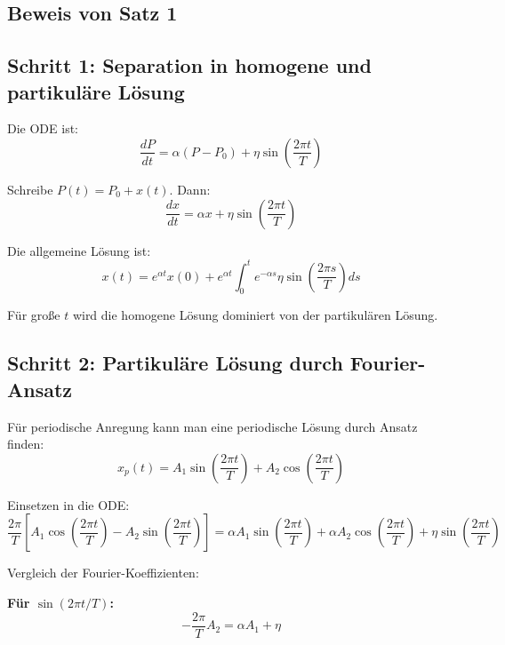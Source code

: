 \documentclass[a4paper, 12pt, twoside, openright]{report}
\theoremstyle{definition}
\theoremstyle{definition}
\begin{document}
\subsection{Beweis von Satz 1}

\subsection{Schritt 1: Separation in homogene und partikuläre Lösung}

Die ODE ist:
\begin{equation}
    \frac{dP}{dt} = \alpha(P - P_0) + \eta \sin\left(\frac{2\pi t}{T}\right)
\end{equation}

Schreibe $P(t) = P_0 + x(t)$. Dann:
\begin{equation}
    \frac{dx}{dt} = \alpha x + \eta \sin\left(\frac{2\pi t}{T}\right)
\end{equation}

Die allgemeine Lösung ist:
\begin{equation}
    x(t) = e^{\alpha t} x(0) + e^{\alpha t} \int_0^t e^{-\alpha s} \eta \sin\left(\frac{2\pi s}{T}\right) ds
\end{equation}

Für große $t$ wird die homogene Lösung dominiert von der partikulären Lösung.

\subsection{Schritt 2: Partikuläre Lösung durch Fourier-Ansatz}

Für periodische Anregung kann man eine periodische Lösung durch Ansatz finden:
\begin{equation}
    x_p(t) = A_1 \sin\left(\frac{2\pi t}{T}\right) + A_2 \cos\left(\frac{2\pi t}{T}\right)
\end{equation}

Einsetzen in die ODE:
\begin{equation}
    \frac{2\pi}{T} \left[A_1 \cos\left(\frac{2\pi t}{T}\right) - A_2 \sin\left(\frac{2\pi t}{T}\right)\right] = \alpha A_1 \sin\left(\frac{2\pi t}{T}\right) + \alpha A_2 \cos\left(\frac{2\pi t}{T}\right) + \eta \sin\left(\frac{2\pi t}{T}\right)
\end{equation}

Vergleich der Fourier-Koeffizienten:

\textbf{Für $\sin(2\pi t / T)$:}
\begin{equation}
    -\frac{2\pi}{T} A_2 = \alpha A_1 + \eta
\end{equation}
\end{document}
